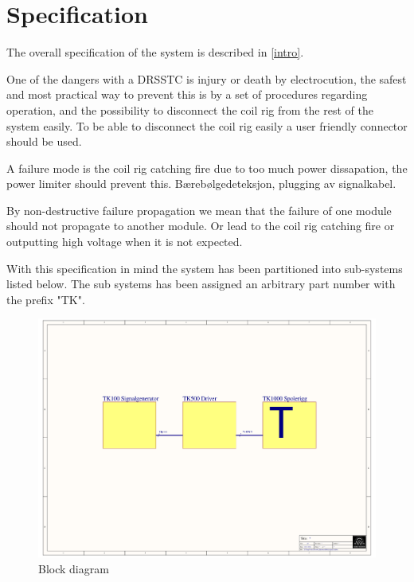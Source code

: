 \section{Specification}
The overall specification of the system is described in \cref{intro}.

One of the dangers with a DRSSTC is injury or death by electrocution, the safest and most practical way to prevent this is by a set of procedures regarding operation, and the possibility to disconnect the coil rig from the rest of the system easily. To be able to disconnect the coil rig easily a user friendly connector should be used.

A failure mode is the coil rig catching fire due to too much power dissapation, the power limiter should prevent this. Bærebølgedeteksjon, plugging av signalkabel.

By non-destructive failure propagation we mean that the failure of one module should not propagate to another module. Or lead to the coil rig catching fire or outputting high voltage when it is not expected.





With this specification in mind the system has been partitioned into sub-systems listed below. The sub systems has been assigned an arbitrary part number with the prefix "TK".

\begin{figure}
    \centering
    \includegraphics[trim={5cm 9cm 4.8cm 6.5cm},clip,width=\textwidth]{img/Blokkskjema.pdf}
    \caption{Block diagram}
    \label{fig:blokksjema}
\end{figure}

